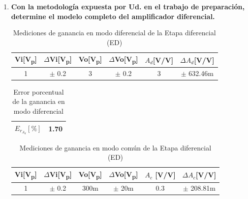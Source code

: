 \begin{enumerate}
  \item \textbf{Con la metodología expuesta por Ud. en el trabajo de preparación, determine el modelo completo del amplificador diferencial.}
        \begin{table}[H]
          \centering
          \begin{tabular}{|c|c|c|c|c|c|}
            \hline
            \textbf{Vi[V\textsubscript{p}]} & \textbf{\(\Delta\)Vi[V\textsubscript{p}]} & \textbf{Vo[V\textsubscript{p}]} & \textbf{\(\Delta\)Vo[V\textsubscript{p}]} & \textbf{$A_d$[V/V]} & \textbf{\(\Delta\)$A_d$[V/V]} \\\hline
            1                               & \(\pm\) 0.2                               & 3                               & \(\pm\) 0.2                               & 3                   & \(\pm\) 632.46m               \\\hline
          \end{tabular}
          \caption{Mediciones de ganancia en modo diferencial de la Etapa diferencial (ED)}
          \label{tab:ganancia_ed}
        \end{table}

        \begin{table}[H]
          \centering
          \begin{tabular}{|c|c|}
            \hline
            $E_{r_{A_d}} [\%]$ & 1.70 \\
            \hline
          \end{tabular}
          \caption{Error porcentual de la ganancia en modo diferencial}
          \label{tab:error_porcentual2_ad}
        \end{table}

        \begin{table}[H]
          \centering
          \begin{tabular}{|c|c|c|c|c|c|}
            \hline
            \textbf{Vi[V\textsubscript{p}]} & \textbf{\(\Delta\)Vi[V\textsubscript{p}]} & \textbf{Vo[V\textsubscript{p}]} & \textbf{\(\Delta\)Vo[V\textsubscript{p}]} & \textbf{$A_c$ [V/V]} & \textbf{\(\Delta\)$A_c$[V/V]} \\\hline
            1                               & \(\pm\) 0.2                               & 300m                            & \(\pm\) 20m                               & 0.3                  & \(\pm\) 208.81m               \\\hline
          \end{tabular}
          \caption{Mediciones de ganancia en modo común de la Etapa diferencial (ED)}
          \label{tab:ganancia_ed_modo_comun}
        \end{table}



\end{enumerate}
